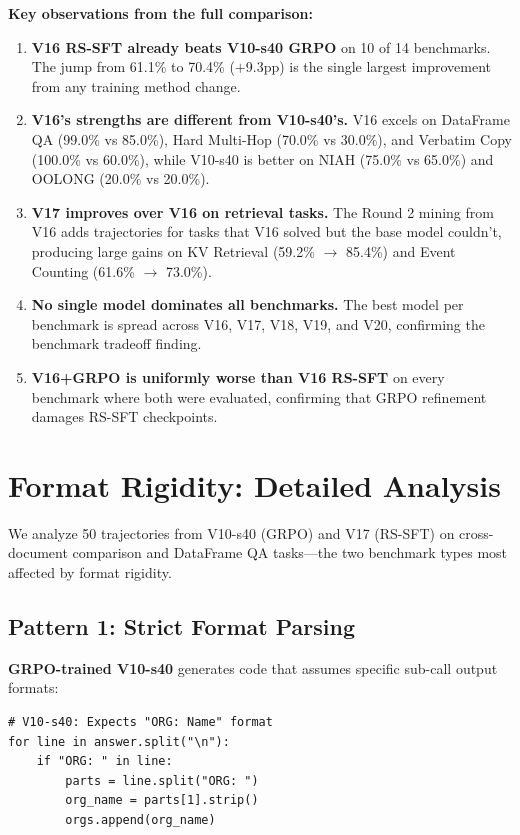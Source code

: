\documentclass{article}
\begin{document}
\textbf{Key observations from the full comparison:}

\begin{enumerate}
    \item \textbf{V16 RS-SFT already beats V10-s40 GRPO} on 10 of 14 benchmarks. The jump from 61.1\% to 70.4\% ($+$9.3pp) is the single largest improvement from any training method change.

    \item \textbf{V16's strengths are different from V10-s40's.} V16 excels on DataFrame QA (99.0\% vs 85.0\%), Hard Multi-Hop (70.0\% vs 30.0\%), and Verbatim Copy (100.0\% vs 60.0\%), while V10-s40 is better on NIAH (75.0\% vs 65.0\%) and OOLONG (20.0\% vs 20.0\%).

    \item \textbf{V17 improves over V16 on retrieval tasks.} The Round 2 mining from V16 adds trajectories for tasks that V16 solved but the base model couldn't, producing large gains on KV Retrieval (59.2\% $\to$ 85.4\%) and Event Counting (61.6\% $\to$ 73.0\%).

    \item \textbf{No single model dominates all benchmarks.} The best model per benchmark is spread across V16, V17, V18, V19, and V20, confirming the benchmark tradeoff finding.

    \item \textbf{V16+GRPO is uniformly worse than V16 RS-SFT} on every benchmark where both were evaluated, confirming that GRPO refinement damages RS-SFT checkpoints.
\end{enumerate}

\section{Format Rigidity: Detailed Analysis}
\label{app:format-rigidity}

We analyze 50 trajectories from V10-s40 (GRPO) and V17 (RS-SFT) on cross-document comparison and DataFrame QA tasks---the two benchmark types most affected by format rigidity.

\subsection{Pattern 1: Strict Format Parsing}

\textbf{GRPO-trained V10-s40} generates code that assumes specific sub-call output formats:
{\footnotesize
\begin{verbatim}
# V10-s40: Expects "ORG: Name" format
for line in answer.split("\n"):
    if "ORG: " in line:
        parts = line.split("ORG: ")
        org_name = parts[1].strip()
        orgs.append(org_name)
\end{verbatim}
}
\end{document}

